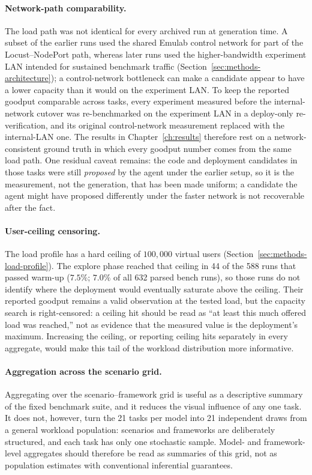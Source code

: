 \paragraph{Network-path comparability.} The load path was not identical for
every archived run at generation time. A subset of the earlier runs used the
shared Emulab control network for part of the Locust--NodePort path, whereas
later runs used the higher-bandwidth experiment LAN intended for sustained
benchmark traffic (Section~\ref{sec:methods-architecture}); a control-network
bottleneck can make a candidate appear to have a lower capacity than it would
on the experiment LAN. To keep the reported goodput comparable across tasks,
every experiment measured before the internal-network cutover was
re-benchmarked on the experiment LAN in a deploy-only re-verification, and its
original control-network measurement replaced with the internal-LAN one. The
results in Chapter~\ref{ch:results} therefore rest on a network-consistent
ground truth in which every goodput number comes from the same load path. One
residual caveat remains: the code and deployment candidates in those tasks
were still \emph{proposed} by the agent under the earlier setup, so it is the
measurement, not the generation, that has been made uniform; a candidate the
agent might have proposed differently under the faster network is not
recoverable after the fact.

\paragraph{User-ceiling censoring.} The load profile has a hard ceiling of
$100{,}000$ virtual users (Section~\ref{sec:methods-load-profile}). The
explore phase reached that ceiling in 44 of the 588 runs that passed warm-up
($7.5\%$; $7.0\%$ of all 632 parsed bench runs), so those runs do not identify
where the deployment would eventually saturate above the ceiling. Their
reported goodput remains a valid observation at the tested load, but the
capacity search is right-censored: a ceiling hit should be read as ``at least
this much offered load was reached,'' not as evidence that the measured value
is the deployment's maximum. Increasing the ceiling, or reporting ceiling
hits separately in every aggregate, would make this tail of the workload
distribution more informative.

\paragraph{Aggregation across the scenario grid.} Aggregating over the
scenario--framework grid is useful as a descriptive summary of the fixed
benchmark suite, and it reduces the visual influence of any one task. It does
not, however, turn the 21 tasks per model into 21 independent draws from a
general workload population: scenarios and frameworks are deliberately
structured, and each task has only one stochastic sample. Model- and
framework-level aggregates should therefore be read as summaries of this
grid, not as population estimates with conventional inferential guarantees.

